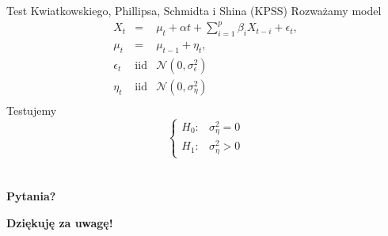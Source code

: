 \documentclass[a4paper, 11pt]{beamer}
\begin{document}
	\begin{frame}{Test Kwiatkowskiego, Phillipsa, Schmidta i Shina (KPSS)}
		Rozważamy model \begin{eqnarray*}
			X_{t} & = & \mu_t + \alpha t + \sum_{i=1}^{p} \beta_{i} X_{t-i} + \epsilon_{t},\\
			\mu_{t} & = & \mu_{t-1} + \eta_{t},\\
			\epsilon_t & \mbox{iid} & \mathcal{N}\left(0, \sigma_{\epsilon}^2\right)\\
			\eta_t & \mbox{iid} & \mathcal{N}\left(0, \sigma_{\eta}^2\right)\\
		\end{eqnarray*}
		Testujemy \[
			\begin{cases}
				H_{0}: & \sigma_{\eta}^2 = 0\\
				H_{1}: & \sigma_{\eta}^2 > 0
			\end{cases}
		\]
	\end{frame}

	\section*{}

	\begin{frame}
		\center
		\Huge \bfseries
		Pytania?
	\end{frame}

	\begin{frame}
		\center
		\Huge \bfseries
		Dziękuję za uwagę!
	\end{frame}
\end{document}
